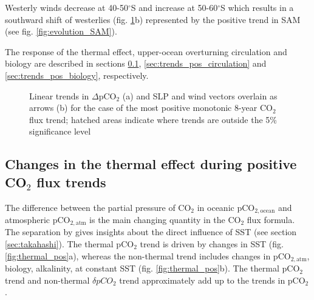 Westerly winds decrease at 40-50$^\circ$S and increase at 50-60$^\circ$S which results in a southward shift of westerlies (fig. \ref{fig:pco2_pos}b) represented by the positive trend in \acs{SAM} (see fig. \ref{fig:evolution_SAM}). \newline


The response of the thermal effect, upper-ocean overturning circulation and biology are described in sections \ref{sec:trends_pos_thermal}, \ref{sec:trends_pos_circulation} and \ref{sec:trends_pos_biology}, respectively.


\begin{figure}[h!]
\centering
	\caption{Linear trends in $\Delta$pCO$_2$ (a) and \ac{SLP} and wind vectors overlain as arrows (b) for the case of the most positive monotonic 8-year CO$_2$ flux trend; hatched areas indicate where trends are outside the 5\% significance level}%
	\label{fig:pco2_pos}
\end{figure}






\clearpage

\subsection{Changes in the thermal effect during positive CO$_2$ flux trends}
\label{sec:trends_pos_thermal}

The difference between the partial pressure of CO$_2$ in oceanic pCO$_{2,\text{ocean}}$ and atmospheric pCO$_{2,\text{atm}}$ is the main changing quantity in the CO$_2$ flux formula. The separation by \cite{Takahashi2002} gives insights about the direct influence of \ac{SST} (see section \ref{sec:takahashi}). The thermal pCO$_2$ trend is driven by changes in \acs{SST} (fig. \ref{fig:thermal_pos}a), whereas the non-thermal trend includes changes in pCO$_{2,\text{atm}}$, biology, alkalinity, at constant \acs{SST} (fig. \ref{fig:thermal_pos}b). The thermal pCO$_2$ trend and non-thermal $\delta pCO_2$ trend approximately add up to the trends in pCO$_2$ \citep{landschuetzer2015}.

